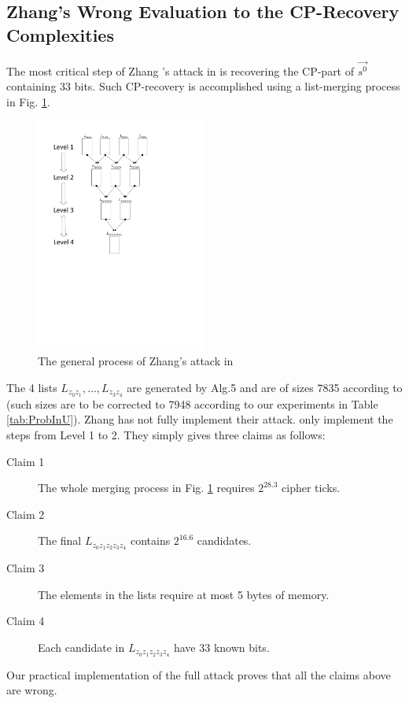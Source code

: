 \subsection{Zhang's Wrong Evaluation to the CP-Recovery Complexities}\label{sec:ZhangWrongCompAnalysis}
The most critical step of Zhang \etal's attack in \cite{AC:Zhang19} is recovering the CP-part of $\vec{s^0}$ containing 33 bits.
Such CP-recovery is accomplished using a list-merging process in Fig. \ref{fig:MergeZhang}.
\begin{figure}[htbp]
  \centering
  \includegraphics[width=0.5\textwidth]{pic/MergeZhang.pdf}
  \caption{The general process of Zhang's attack in \cite{AC:Zhang19}}\label{fig:MergeZhang}
\end{figure}
The 4 lists $L_{z_0z_1},\ldots, L_{z_3z_4}$ are generated by Alg.5 and are of sizes 7835 according to \cite{AC:Zhang19} (such sizes are to be corrected to 7948 according to our experiments in Table \ref{tab:ProbInU}).
Zhang \etal has not fully implement their attack.
\cite{AC:Zhang19} only implement the steps from Level 1 to 2.
They simply gives three claims as follows:
\begin{description}
  \item[Claim 1] The whole merging process in Fig. \ref{fig:MergeZhang} requires $2^{28.3}$ cipher ticks.
  \item[Claim 2] The final $L_{z_0z_1z_2z_3z_4}$ contains $2^{16.6}$ candidates.
  \item[Claim 3] The elements in the lists require at most 5 bytes of memory.
  \item[Claim 4] Each candidate in $L_{z_0z_1z_2z_3z_4}$ have 33 known bits.
\end{description}
Our practical implementation of the full attack proves that all the claims above are wrong.

